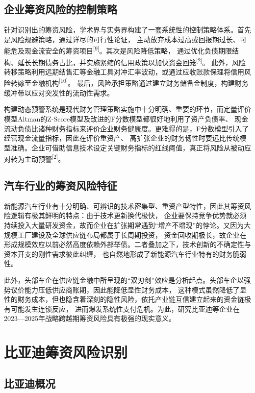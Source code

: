 \documentclass[12pt,a4paper,fontset=windows,UTF8]{ctexart}
\begin{document}
\subsection{企业筹资风险的控制策略}

针对识别出的筹资风险，学术界与实务界构建了一套系统性的控制策略体系。首先是风险规避策略，通过详尽的可行性论证，
  主动放弃成本过高或回报期过长、可能危及现金流安全的筹资项目\textsuperscript{[9]}。其次是风险降低策略，
  通过优化负债期限结构、延长长期债务占比，并实施紧缩的信用政策以加快资金回笼\textsuperscript{[2]}。
  此外，风险转移策略利用远期结售汇等金融工具对冲汇率波动，或通过应收账款保理将信用风险转嫁至金融机构\textsuperscript{[10]}。
  最后，风险承担策略通过建立财务储备金制度，构建财务缓冲带以应对突发性的流动性需求。

构建动态预警系统是现代财务管理策略实施中十分明确、重要的环节，而定量评价模型Altman的Z-Score模型及改进的F分数模型都很好地利用了资产负债率、
  现金流动负债比诸种财务指标来评价企业财务健康度。更难得的是，F分数模型引入了经营现金流量指标，因此在评价重资产、
  高扩张企业的财务韧性时要远比传统模型准确。企业可借助信息技术设定关键财务指标的红线阈值，真正将风险从被动应对转为主动预警\textsuperscript{[2]}。

\subsection{汽车行业的筹资风险特征}

新能源汽车行业有十分明确、可辨识的技术密集型、重资产型特性，因此其筹资风险逻辑有极其鲜明的特点：由于技术更新换代极快，
  企业要保持竞争优势就必须持续投入大量研发资金，故而企业在扩张期常遇到“增产不增现”的悖论。又因为大规模工厂建设及全球供应链布局都属于长周期投资，
  资金回收期极长，故企业在形成规模效应以前必然高度依赖外部举债。二者叠加之下，技术创新的不确定性与资本开支的刚性需求彼此纠缠，
  也自然地形成了新能源汽车行业特有的财务脆弱性。

此外，头部车企在供应链金融中所呈现的“双刃剑”效应是分析起点。头部车企以强势议价能力压低供应商账期，因此能降低显性财务成本，
  这种模式虽然降低了显性的财务成本，但也隐含着深刻的隐性风险，依托产业链互信建立起来的资金链极有可能发生连锁反应，
  进而爆发系统性支付危机。为此，研究比亚迪等企业在2023—2025年战略跨越期筹资风险具有极强的现实意义。

\section{比亚迪筹资风险识别}

\subsection{比亚迪概况}
\end{document}
